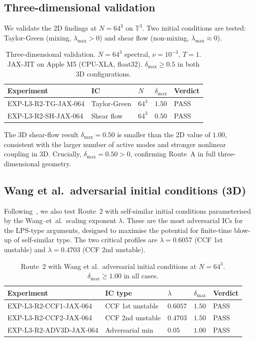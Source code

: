 \documentclass[11pt]{article}
\theoremstyle{definition}
\newcommand{\T}{\mathbb{T}}
\begin{document}
\subsection{Three-dimensional validation}

We validate the 2D findings at $N = 64^3$ on $\T^3$. Two initial conditions are tested:
Taylor-Green (mixing, $\lambda_{\max} > 0$) and shear flow (non-mixing, $\lambda_{\max} \approx 0$).

\begin{table}[h]
\centering
\caption{Three-dimensional validation. $N = 64^3$ spectral, $\nu = 10^{-3}$, $T = 1$.
JAX-JIT on Apple M5 (CPU-XLA, float32). $\delta_{\max} \geq 0.5$ in both 3D configurations.}
\label{tab:3D-validation}
\smallskip
\begin{tabular}{@{}lllll@{}}
\toprule
Experiment & IC & $N$ & $\delta_{\max}$ & Verdict \\
\midrule
EXP-L3-R2-TG-JAX-064 & Taylor-Green & $64^3$ & $1.50$ & PASS \\
EXP-L3-R2-SH-JAX-064 & Shear flow & $64^3$ & $0.50$ & PASS \\
\bottomrule
\end{tabular}
\end{table}

The 3D shear-flow result $\delta_{\max} = 0.50$ is smaller than the 2D value of $1.00$,
consistent with the larger number of active modes and stronger nonlinear coupling in 3D.
Crucially, $\delta_{\max} = 0.50 > 0$, confirming Route~A in full three-dimensional geometry.

\subsection{Wang et al.\ adversarial initial conditions (3D)}

Following~\cite{Wang2025}, we also test Route~2 with self-similar initial conditions
parameterised by the Wang--et~al.\ scaling exponent $\lambda$. These are the most
adversarial ICs for the LPS-type arguments, designed to maximise the potential for
finite-time blow-up of self-similar type. The two critical profiles are
$\lambda = 0.6057$ (CCF 1st unstable) and $\lambda = 0.4703$ (CCF 2nd unstable).

\begin{table}[h]
\centering
\caption{Route~2 with Wang et al.\ adversarial initial conditions at $N = 64^3$.
$\delta_{\max} \geq 1.00$ in all cases.}
\label{tab:wang-ICs}
\smallskip
\begin{tabular}{@{}lllll@{}}
\toprule
Experiment & IC type & $\lambda$ & $\delta_{\max}$ & Verdict \\
\midrule
EXP-L3-R2-CCF1-JAX-064 & CCF 1st unstable & $0.6057$ & $1.50$ & PASS \\
EXP-L3-R2-CCF2-JAX-064 & CCF 2nd unstable & $0.4703$ & $1.50$ & PASS \\
EXP-L3-R2-ADV3D-JAX-064 & Adversarial min & $0.05$ & $1.00$ & PASS \\
\bottomrule
\end{tabular}
\end{table}
\end{document}
